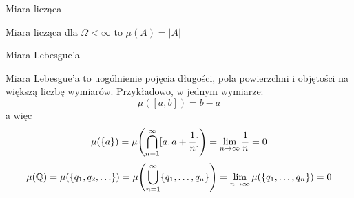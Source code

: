 \begin{example}
	Miara licząca

	Miara licząca dla \(\Omega < \infty\) to \(\mu(A) = |A|\)
\end{example}

\begin{example}
	Miara Lebesgue'a

	Miara Lebesgue'a to uogólnienie pojęcia długości, pola powierzchni i objętości na większą liczbę wymiarów. Przykładowo, w jednym wymiarze:
	\[
		\mu([a, b]) = b - a
	\]
	a więc
	\[
		\mu(\set{a}) = \mu\pars{\bigcap_{n=1}^\infty [a, a + \frac{1}{n}]} = \lim_{n \to \infty} \frac{1}{n} = 0
	\]
	\[
		\mu(\rational) = \mu(\set{q_1, q_2, \dots}) = \mu\pars{\bigcup_{n=1}^\infty \set{q_1, \dots, q_n}} = \lim_{n \to \infty} \mu(\set{q_1, \dots, q_n}) = 0
	\]
\end{example}
